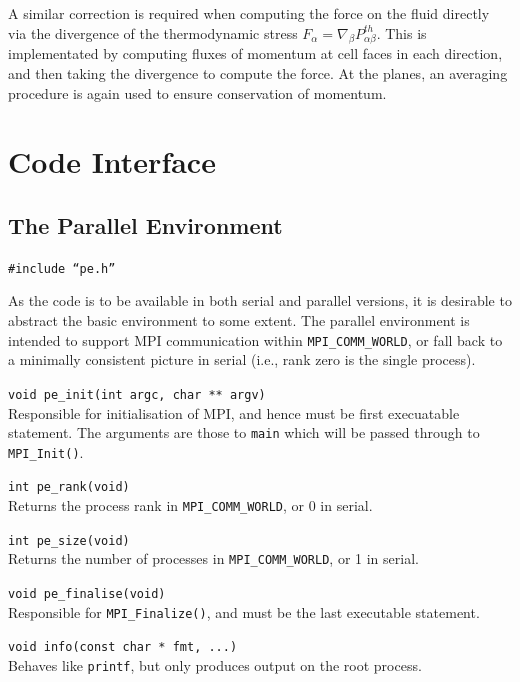 A similar correction is required when computing the force on the fluid
directly via the divergence of the thermodynamic stress
$F_\alpha = \nabla_\beta P_{\alpha\beta}^{th}$. This is implementated
by computing fluxes of momentum at cell faces in each direction, and
then taking the divergence to compute the force. At the planes, an
averaging procedure is again used to ensure conservation of momentum.



\vfill
\pagebreak

\section{Code Interface}

\subsection{The Parallel Environment}

\texttt{\#include ``pe.h''}

As the code is to be available in both serial and parallel versions,
it is desirable to abstract the basic environment to some extent.
The parallel environment is intended to support MPI communication
within \texttt{MPI\_COMM\_WORLD}, or fall back to a minimally
consistent picture in serial (i.e., rank zero is the single process).

\texttt{void pe\_init(int argc, char ** argv)}\\
Responsible for initialisation of MPI, and hence must be first
execuatable statement. The arguments are those to \texttt{main}
which will be passed through to \texttt{MPI\_Init()}.

\texttt{int pe\_rank(void)}\\
Returns the process rank in \texttt{MPI\_COMM\_WORLD}, or 0 in
serial.

\texttt{int pe\_size(void)}\\
Returns the number of processes in \texttt{MPI\_COMM\_WORLD}, or
1 in serial.

\texttt{void pe\_finalise(void)}\\
Responsible for \texttt{MPI\_Finalize()}, and must be the last
executable statement.

\texttt{void info(const char * fmt, ...)}\\
Behaves like \texttt{printf}, but only produces output on the
root process.

